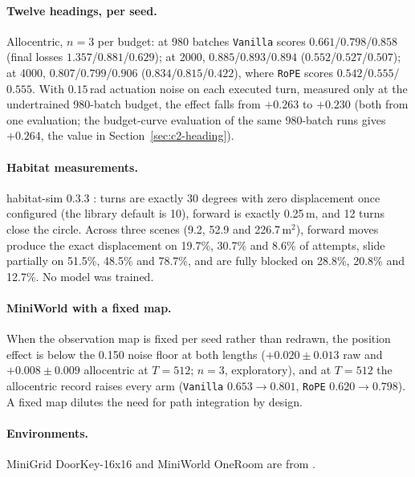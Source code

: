 \documentclass[10pt]{article}
\newcommand{\arm}[1]{\texttt{#1}}
\begin{document}
\paragraph{Twelve headings, per seed.} Allocentric, $n=3$ per budget: at 980 batches \arm{Vanilla} scores
$0.661$/$0.798$/$0.858$ (final losses $1.357$/$0.881$/$0.629$); at 2000, $0.885$/$0.893$/$0.894$
($0.552$/$0.527$/$0.507$); at 4000, $0.807$/$0.799$/$0.906$ ($0.834$/$0.815$/$0.422$), where \arm{RoPE} scores
$0.542$/$0.555$/$0.555$. With $0.15$\,rad actuation noise on each executed turn, measured only at the
undertrained 980-batch budget, the effect falls from $+0.263$ to $+0.230$ (both from one evaluation; the budget-curve evaluation of the
same 980-batch runs gives $+0.264$, the value in Section~\ref{sec:c2-heading}). %

\paragraph{Habitat measurements.} habitat-sim 0.3.3 \citep{savva2019habitat}: turns are exactly 30 degrees with
zero displacement once configured (the library default is 10), forward is exactly 0.25\,m, and 12 turns close
the circle. Across three scenes (9.2, 52.9 and 226.7\,m$^2$), forward moves produce the exact displacement on
19.7\%, 30.7\% and 8.6\% of attempts, slide partially on 51.5\%, 48.5\% and 78.7\%, and are fully blocked on
28.8\%, 20.8\% and 12.7\%. No model was trained. %

\paragraph{MiniWorld with a fixed map.} When the observation map is fixed per seed rather than redrawn, the
position effect is below the 0.150 noise floor at both lengths ($+0.020\pm0.013$ raw and $+0.008\pm0.009$
allocentric at $T=512$; $n=3$, exploratory), and at $T=512$ the allocentric record raises every arm
(\arm{Vanilla} $0.653\to0.801$, \arm{RoPE} $0.620\to0.798$). A fixed map dilutes
the need for path integration by design. %

\paragraph{Environments.} MiniGrid DoorKey-16x16 and MiniWorld OneRoom are from \citet{chevalier2023minigrid}.
\end{document}
